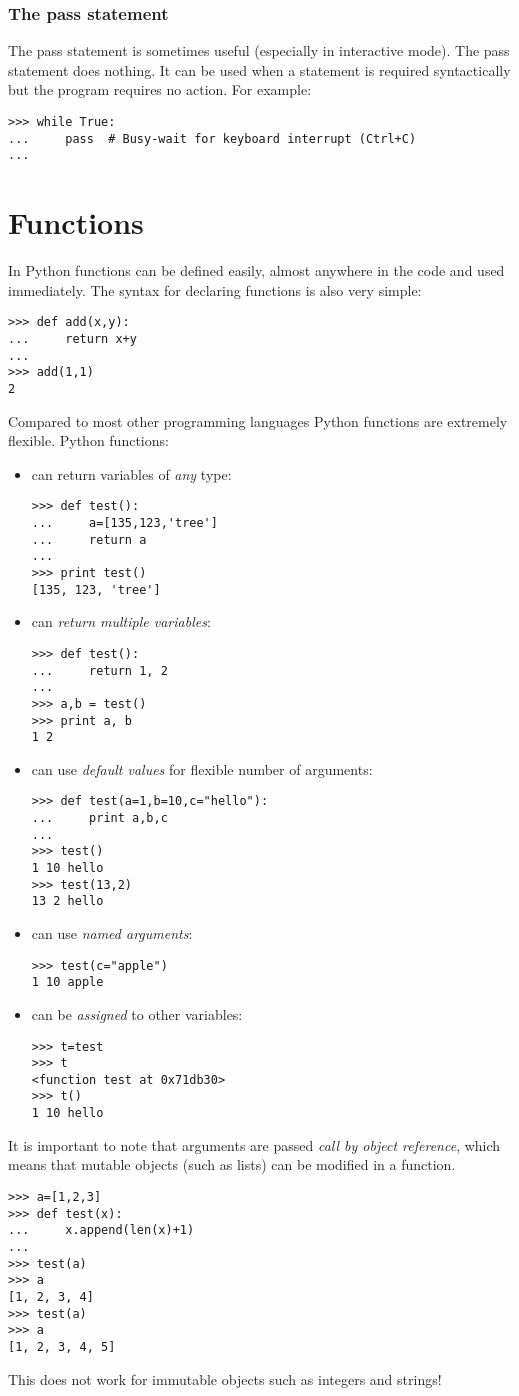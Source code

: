\documentclass[10pt,a4paper]{article}
\begin{document}
\subsubsection{The pass statement}
The pass statement is sometimes useful (especially in interactive mode). The pass statement does nothing. It can be used when a statement is required syntactically but the program requires no action. For example:
\begin{lstlisting}
>>> while True:
...     pass  # Busy-wait for keyboard interrupt (Ctrl+C)
...
\end{lstlisting}
\section{Functions}
In Python functions can be defined easily, almost anywhere in the code and used immediately.
The syntax for declaring functions is also very simple:
\begin{lstlisting}
>>> def add(x,y):
...     return x+y
... 
>>> add(1,1)
2
\end{lstlisting}
Compared to most other programming languages Python functions are extremely flexible.
Python functions:
\begin{itemize}
\item can return variables of \emph{any} type:
\begin{lstlisting}
>>> def test():
...     a=[135,123,'tree']
...     return a
... 
>>> print test()
[135, 123, 'tree']
\end{lstlisting}
\item can \emph{return multiple variables}:
\begin{lstlisting}
>>> def test():
...     return 1, 2
... 
>>> a,b = test()
>>> print a, b
1 2
\end{lstlisting}
\item can use \emph{default values} for flexible number of arguments:
\begin{lstlisting}
>>> def test(a=1,b=10,c="hello"):
...     print a,b,c
... 
>>> test()
1 10 hello
>>> test(13,2)
13 2 hello
\end{lstlisting}
\item can use \emph{named arguments}:
\begin{lstlisting}
>>> test(c="apple")
1 10 apple
\end{lstlisting}
\item can be \emph{assigned} to other variables:
\begin{lstlisting}
>>> t=test
>>> t
<function test at 0x71db30>
>>> t()
1 10 hello
\end{lstlisting}
\end{itemize}
It is important to note that arguments are passed \emph{call by object reference}, which means that mutable objects (such as lists) can be modified in a function.
\begin{lstlisting}
>>> a=[1,2,3]
>>> def test(x):
...     x.append(len(x)+1)
... 
>>> test(a)
>>> a
[1, 2, 3, 4]
>>> test(a)
>>> a
[1, 2, 3, 4, 5]
\end{lstlisting}
This does not work for immutable objects such as integers and strings!
\end{document}

